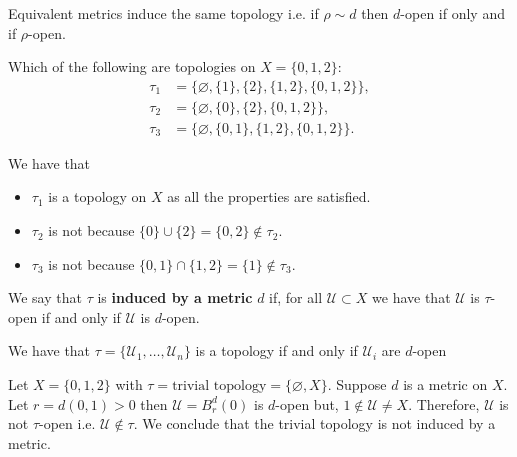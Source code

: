 \documentclass[12pt, a4paper]{article}
\begin{document}
\begin{theorem}
    Equivalent metrics induce the same topology i.e. if \(\rho \sim d\) then \(d\)-open if only and if \(\rho\)-open.
\end{theorem}

\begin{mdexample}
    Which of the following are topologies on \(X = \{0,1,2\}\):
    \[\begin{aligned}
        \tau_1 &= \{ \varnothing, \{1\}, \{2\}, \{1,2\}, \{0,1,2\} \}, \\
        \tau_2 &= \{\varnothing, \{0\}, \{2\}, \{0,1,2\} \}, \\
        \tau_3 &= \{\varnothing, \{0,1\}, \{1,2\}, \{0,1,2\} \}.
    \end{aligned}\]
    \begin{solution}
        We have that 
        \begin{itemize}
            \item \(\tau_1\) is a topology on \(X\) as all the properties are satisfied.
            \item \(\tau_2\) is not because \(\{0\} \cup \{2\} = \{0,2\} \not\in \tau_2\).
            \item \(\tau_3\) is not because \(\{0,1\} \cap \{1,2\} = \{1\} \not\in \tau_3\).
        \end{itemize}
    \end{solution}
\end{mdexample}

\begin{definition}
    We say that \(\tau\) is \textbf{induced by a metric} \(d\)  if, for all \(\mathcal{U} \subset X\) we have that \(\mathcal{U}\) is \(\tau\)-open if and only if \(\mathcal{U}\) is \(d\)-open.
\end{definition}

\begin{mdnote}
    We have that \(\tau = \{\mathcal{U}_1, \ldots, \mathcal{U}_n\}\) is a topology if and only if \(\mathcal{U}_i\) are \(d\)-open
\end{mdnote}

\begin{example}
    Let \(X = \{0,1,2\}\) with \(\tau = \text{trivial topology} = \{\varnothing, X\}\). Suppose \(d\) is a metric on \(X\). Let \(r = d(0,1) >0\) then \(\mathcal{U} = B_r^d(0)\) is \(d\)-open but, \(1 \notin \mathcal{U} \neq X\). Therefore, \(\mathcal{U}\) is not \(\tau\)-open i.e. \(\mathcal{U} \not\in \tau\). We conclude that the trivial topology is not induced by a metric.
\end{example}
\end{document}
